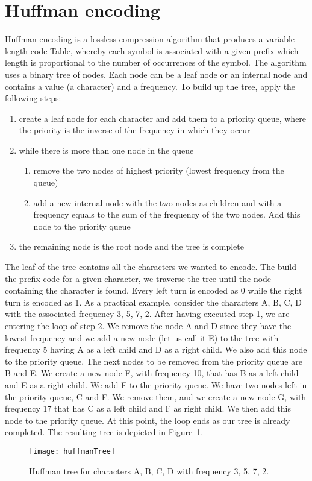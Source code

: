 \section{Huffman encoding}
Huffman encoding is a lossless compression algorithm that produces a variable-length code
Table, whereby each symbol is associated with a given prefix which length is proportional
to the number of occurrences of the symbol. The algorithm uses a binary tree of nodes.
Each node can be a leaf node or an internal node and contains a value (a character) and a
frequency. To build up the tree, apply the following steps:
\begin{enumerate}
    \item create a leaf node for each character and add them to a priority queue, where
    the priority is the inverse of the frequency in which they occur
    \item while there is more than one node in the queue
    \begin{enumerate}
        \item remove the two nodes of highest priority (lowest frequency from the queue)
        \item add a new internal node with the two nodes as children and with a frequency
        equals to the sum of the frequency of the two nodes. Add this node to the priority queue
    \end{enumerate}
    \item the remaining node is the root node and the tree is complete
\end{enumerate}
The leaf of the tree contains all the characters we wanted to encode. The build the prefix
code for a given character, we traverse the tree until the node containing the character is
found. Every left turn is encoded as 0 while the right turn is encoded as 1.
As a practical example, consider the characters A, B, C, D with the associated frequency
3, 5, 7, 2. After having executed step 1, we are entering the loop of step 2.
We remove the node A and D since they have the lowest frequency and we add a new node
(let us call it E) to the tree with frequency 5 having A as a left child and D as a right
child. We also add this node to the priority queue. The next nodes to be removed from the
priority queue are B and E. We create a new node F, with frequency 10, that has B as a left
child and E as a right child. We add F to the priority queue.
We have two nodes left in the priority queue, C and F. We remove them, and we create a new
node G, with frequency 17 that has C as a left child and F as right child. We then add this
node to the priority queue. At this point, the loop ends as our tree is already completed.
The resulting tree is depicted in Figure~\ref{huffman_tree}.

\begin{figure}[!htbp]
\begin{center}
\texttt{[image: huffmanTree]}
\caption[huffman_tree]{Huffman tree for characters A, B, C, D with frequency 3, 5, 7, 2.}
\label{huffman_tree}
\end{center}
\end{figure}